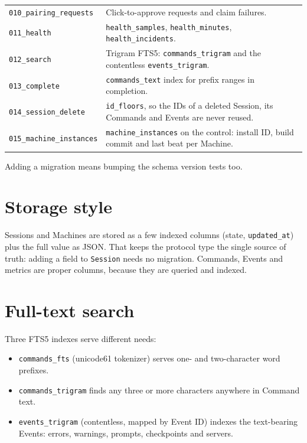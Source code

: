 \begin{small}
\begin{longtable}{>{\raggedright\arraybackslash}p{0.288\dimexpr \linewidth-4\tabcolsep\relax}>{\raggedright\arraybackslash}p{0.712\dimexpr \linewidth-4\tabcolsep\relax}}
\texttt{010\_\allowbreak{}pairing\_\allowbreak{}requests} & Click-to-approve requests and claim failures. \\
\texttt{011\_\allowbreak{}health} & \texttt{health\_\allowbreak{}samples}, \texttt{health\_\allowbreak{}minutes}, \texttt{health\_\allowbreak{}incidents}. \\
\texttt{012\_\allowbreak{}search} & Trigram FTS5: \texttt{commands\_\allowbreak{}trigram} and the contentless \texttt{events\_\allowbreak{}trigram}. \\
\texttt{013\_\allowbreak{}complete} & \texttt{commands\_\allowbreak{}text} index for prefix ranges in completion. \\
\texttt{014\_\allowbreak{}session\_\allowbreak{}delete} & \texttt{id\_\allowbreak{}floors}, so the IDs of a deleted Session, its Commands and Events are never reused. \\
\texttt{015\_\allowbreak{}machine\_\allowbreak{}instances} & \texttt{machine\_\allowbreak{}instances} on the control: install ID, build commit and last beat per Machine. \\
\bottomrule
\end{longtable}
\end{small}

Adding a migration means bumping the schema version tests too.

\section{\texorpdfstring{Storage style}{Storage style}}

Sessions and Machines are stored as a few indexed columns (state, \texttt{updated\_\allowbreak{}at}) plus the full value as JSON. That keeps the protocol type the single source of truth: adding a field to \texttt{Session} needs no migration. Commands, Events and metrics are proper columns, because they are queried and indexed.

\section{\texorpdfstring{Full-text search}{Full-text search}}

Three FTS5 indexes serve different needs:

\begin{itemize}
\item \texttt{commands\_\allowbreak{}fts} (unicode61 tokenizer) serves one- and two-character word prefixes.
\item \texttt{commands\_\allowbreak{}trigram} finds any three or more characters anywhere in Command text.
\item \texttt{events\_\allowbreak{}trigram} (contentless, mapped by Event ID) indexes the text-bearing Events: errors, warnings, prompts, checkpoints and servers.
\end{itemize}

